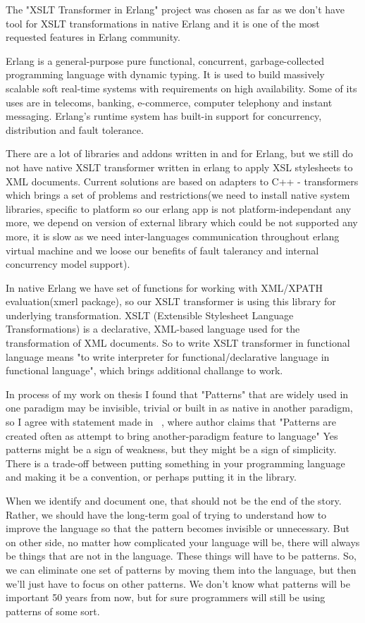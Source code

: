 The "XSLT Transformer in Erlang" project was chosen as far as we don't have tool for XSLT transformations in native Erlang and it is one of the most requested features in Erlang community.

Erlang is a general-purpose pure functional, concurrent, garbage-collected programming language with dynamic typing. It is used to build massively scalable soft real-time systems with requirements on high availability. Some of its uses are in telecoms, banking, e-commerce, computer telephony and instant messaging. Erlang's runtime system has built-in support for concurrency, distribution and fault tolerance.

There are a lot of libraries and addons written in and for Erlang, but we still do not have native XSLT transformer written in erlang to apply XSL stylesheets to XML documents. Current solutions are based on adapters to C++ - transformers which brings a set of problems and restrictions(we need to install native system libraries, specific to platform so our erlang app is not platform-independant any more, we depend on version of external library which could be not supported any more, it is slow as we need inter-languages communication throughout erlang virtual machine and we loose our benefits of fault talerancy and internal concurrency model support).

In native Erlang we have set of functions for working with XML/XPATH evaluation(xmerl package), so our XSLT transformer is using this library for underlying transformation.
XSLT (Extensible Stylesheet Language Transformations) is a declarative, XML-based language used for the transformation of XML documents.
So to write XSLT transformer in functional language means "to write interpreter for functional/declarative language in functional language", which brings additional challange to work.

In process of my work on thesis I found that "Patterns" that are widely used in one paradigm may be invisible, trivial or built in as native in another paradigm, so I agree with statement made in ~\cite{res12}, where author claims that "Patterns are created often as attempt to bring another-paradigm feature to language"
Yes patterns might be a sign of weakness, but they might be a sign of simplicity. There is a trade-off between putting something in your programming language and making it be a convention, or perhaps putting it in the library.

When we identify and document one, that should not be the end of the story. Rather, we should have the long-term goal of trying to understand how to improve the language so that the pattern becomes invisible or unnecessary.
But on other side, no matter how complicated your language will be, there will always be things that are not in the language. These things will have to be patterns. So, we can eliminate one set of patterns by moving them into the language, but then we'll just have to focus on other patterns. We don't know what patterns will be important 50 years from now, but for sure programmers will still be using patterns of some sort.

